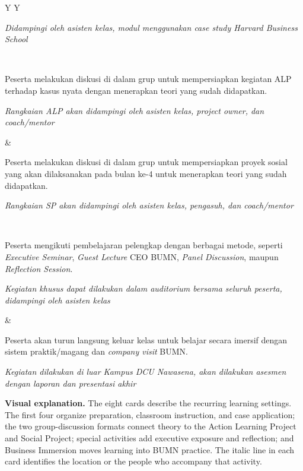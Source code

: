 \documentclass[10pt]{article}
\newcommand{\visualexplanation}[1]{%
  \begin{tcolorbox}[colback=lightgray,colframe=navy!35,boxrule=0.5pt,
    arc=2mm,left=2mm,right=2mm,top=1.5mm,bottom=1.5mm]
  \textbf{Visual explanation.} #1
  \end{tcolorbox}}
\begin{document}
\begin{tabularx}{\textwidth}{Y Y}
\begin{tcolorbox}[colback=white,colframe=yellow!70!orange,title=Case Study \& Roleplay,fonttitle=\bfseries]
\emph{Didampingi oleh asisten kelas, modul menggunakan case study Harvard Business School}
\end{tcolorbox}
\\
\begin{tcolorbox}[colback=white,colframe=green!55,title=Group Discussion ALP,fonttitle=\bfseries]
Peserta melakukan diskusi di dalam grup untuk mempersiapkan kegiatan ALP terhadap kasus nyata dengan menerapkan teori yang sudah didapatkan.

\emph{Rangkaian ALP akan didampingi oleh asisten kelas, project owner, dan coach/mentor}
\end{tcolorbox}
&
\begin{tcolorbox}[colback=white,colframe=teal!45,title=Group Discussion Social Project,fonttitle=\bfseries]
Peserta melakukan diskusi di dalam grup untuk mempersiapkan proyek sosial yang akan dilaksanakan pada bulan ke-4 untuk menerapkan teori yang sudah didapatkan.

\emph{Rangkaian SP akan didampingi oleh asisten kelas, pengasuh, dan coach/mentor}
\end{tcolorbox}
\\
\begin{tcolorbox}[colback=white,colframe=midblue!55,title=Kegiatan Khusus,fonttitle=\bfseries]
Peserta mengikuti pembelajaran pelengkap dengan berbagai metode, seperti \emph{Executive Seminar}, \emph{Guest Lecture} CEO BUMN, \emph{Panel Discussion}, maupun \emph{Reflection Session}.

\emph{Kegiatan khusus dapat dilakukan dalam auditorium bersama seluruh peserta, didampingi oleh asisten kelas}
\end{tcolorbox}
&
\begin{tcolorbox}[colback=white,colframe=blue!45,title=Business Immersion,fonttitle=\bfseries]
Peserta akan turun langsung keluar kelas untuk belajar secara imersif dengan sistem praktik/magang dan \emph{company visit} BUMN.

\emph{Kegiatan dilakukan di luar Kampus DCU Nawasena, akan dilakukan asesmen dengan laporan dan presentasi akhir}
\end{tcolorbox}
\end{tabularx}

\visualexplanation{The eight cards describe the recurring learning settings. The first four organize preparation, classroom instruction, and case application; the two group-discussion formats connect theory to the Action Learning Project and Social Project; special activities add executive exposure and reflection; and Business Immersion moves learning into BUMN practice. The italic line in each card identifies the location or the people who accompany that activity.}
\end{document}
